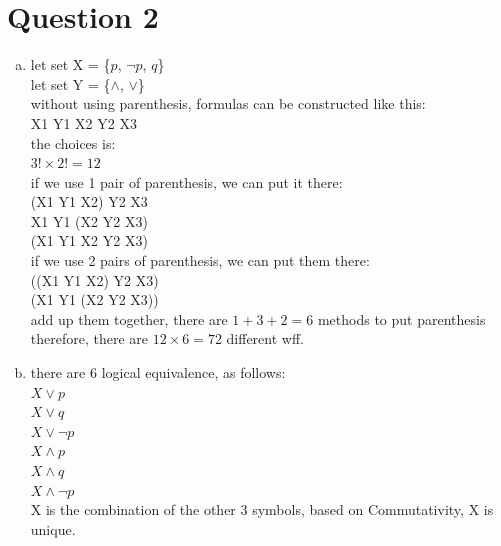 \documentclass[11pt, a4paper]{article}
\begin{document}
\section*{Question 2}
\begin{enumerate}[(a)]
    \item
        let set X = \{$p$, $\neg p$, $q$\}\\
        let set Y = \{$\land$, $\lor$\}\\
        without using parenthesis, formulas can be constructed like this:\\
        X1 Y1 X2 Y2 X3\\
        the choices is:\\
        $3! \times 2! = 12$\\
        if we use 1 pair of parenthesis, we can put it there:\\
        (X1 Y1 X2) Y2 X3\\
        X1 Y1 (X2 Y2 X3)\\
        (X1 Y1 X2 Y2 X3)\\
        if we use 2 pairs of parenthesis, we can put them there:\\
        ((X1 Y1 X2) Y2 X3)\\
        (X1 Y1 (X2 Y2 X3))\\
        add up them together, there are $1+3+2=6$ methods to put parenthesis\\
        therefore, there are $12 \times 6 = 72$ different wff.
    \item
        there are 6 logical equivalence, as follows:\\
        $X \lor p$\\
        $X \lor q$\\
        $X \lor \neg p$\\
        $X \land p$\\
        $X \land q$\\
        $X \land \neg p$\\
        X is the combination of the other 3 symbols, based on Commutativity, X is unique.

    \end{enumerate}
\end{document}
